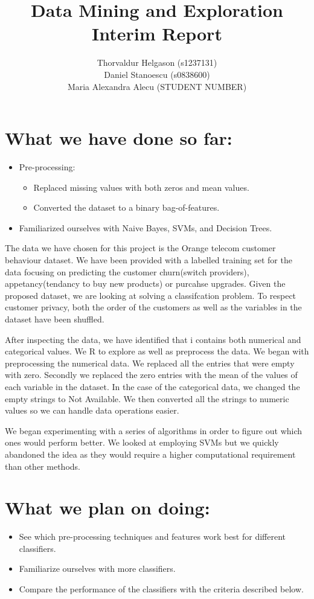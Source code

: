 \documentclass[a4paper,11pt]{article}
\title{Data Mining and Exploration\\Interim Report}
\author{Thorvaldur Helgason (s1237131) \\
Daniel Stanoescu (s0838600) \\
Maria Alexandra Alecu (STUDENT NUMBER)}
\begin{document}
    
\maketitle

\section*{What we have done so far:}
\begin{itemize}
	\item Pre-processing:
	\begin{itemize}
		\item Replaced missing values with both zeros and mean values.
		\item Converted the dataset to a binary bag-of-features.
	\end{itemize}
	\item Familiarized ourselves with Naive Bayes, SVMs, and Decision Trees.  
\end{itemize}

The data we have chosen for this project is the Orange telecom customer behaviour dataset. We have been provided with a labelled training set for the data focusing on predicting the customer churn(switch providers), appetancy(tendancy to buy new products) or purcahse upgrades. Given the proposed dataset, we are looking at solving a classifcation problem.  To respect customer privacy, both the order of the customers as well as the variables in the dataset have been shuffled.

After inspecting the data, we have identified that i contains both numerical and categorical values. We R to explore as well as preprocess the data. We began with preprocessing the numerical data. We replaced all the entries that were empty with zero. Secondly we replaced the zero entries with the mean of the values of each variable in the dataset. In the case of the categorical data, we changed the empty strings to Not Available. We then converted all the strings to numeric values so we can handle data operations easier.

We began experimenting with a series of algorithms in order to figure out which ones would perform better. We looked at employing SVMs but we quickly abandoned the idea as they would require a higher computational requirement than other methods.

\section*{What we plan on doing:}
\begin{itemize}
	\item See which pre-processing techniques and features work best for different classifiers.
	\item Familiarize ourselves with more classifiers.
	\item Compare the performance of the classifiers with the criteria described below.
\end{itemize}
\end{document}
